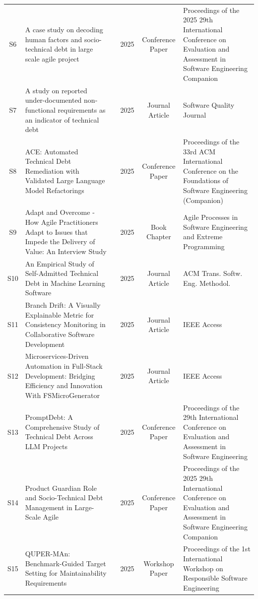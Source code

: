 \documentclass[12pt,reqno, twoside]{amsbook}
\theoremstyle{plain}
\numberwithin{equation}{chapter}
\numberwithin{section}{chapter}
\begin{document}
\begin{landscape}
\begin{center}
\begin{longtable}{|c|p{5cm}|p{4.5cm}|c|c|p{5.5cm}|}
S6  & A case study on decoding human factors and socio-technical debt in large scale agile project & \citeauthor{Herath2025b} & 2025 & Conference Paper & Proceedings of the 2025 29th International Conference on Evaluation and Assessment in Software Engineering Companion \\
S7  & A study on reported under-documented non-functional requirements as an indicator of technical debt & \citeauthor{Scott2025} & 2025 & Journal Article & Software Quality Journal \\
S8  & {ACE}: Automated Technical Debt Remediation with Validated Large Language Model Refactorings & \citeauthor{Tornhill2025} & 2025 & Conference Paper & Proceedings of the 33rd ACM International Conference on the Foundations of Software Engineering (Companion) \\
S9  & Adapt and Overcome - How Agile Practitioners Adapt to Issues that Impede the Delivery of Value: An Interview Study & \citeauthor{Meckenstock2025} & 2025 & Book Chapter & Agile Processes in Software Engineering and Extreme Programming \\
S10 & An Empirical Study of Self-Admitted Technical Debt in Machine Learning Software & \citeauthor{Bhatia2025} & 2025 & Journal Article & ACM Trans. Softw. Eng. Methodol. \\
S11 & Branch Drift: A Visually Explainable Metric for Consistency Monitoring in Collaborative Software Development & \citeauthor{Kegel2025} & 2025 & Journal Article & IEEE Access \\
S12 & Microservices-Driven Automation in Full-Stack Development: Bridging Efficiency and Innovation With {FSMicroGenerator} & \citeauthor{Khalfaoui2025} & 2025 & Journal Article & IEEE Access \\
S13 & {PromptDebt}: A Comprehensive Study of Technical Debt Across {LLM} Projects & \citeauthor{Aljohani2025} & 2025 & Conference Paper & Proceedings of the 29th International Conference on Evaluation and Assessment in Software Engineering \\
S14 & Product Guardian Role and Socio-Technical Debt Management in Large-Scale Agile & \citeauthor{Herath2025} & 2025 & Conference Paper & Proceedings of the 2025 29th International Conference on Evaluation and Assessment in Software Engineering Companion \\
S15 & {QUPER}-{MAn}: Benchmark-Guided Target Setting for Maintainability Requirements & \citeauthor{Borg2025} & 2025 & Workshop Paper & Proceedings of the 1st International Workshop on Responsible Software Engineering \\

\end{longtable}
\end{center}
\end{landscape}
\end{document}

